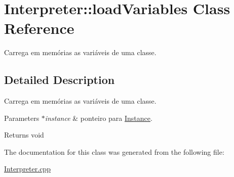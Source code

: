 \hypertarget{class_interpreter_1_1load_variables}{}\section{Interpreter\+:\+:load\+Variables Class Reference}
\label{class_interpreter_1_1load_variables}


Carrega em memórias as variáveis de uma classe.  




\subsection{Detailed Description}
Carrega em memórias as variáveis de uma classe. 


\begin{DoxyParams}{Parameters}
{\em $\ast$instance} & ponteiro para \hyperlink{struct_instance}{Instance}. \\
\hline
\end{DoxyParams}
\begin{DoxyReturn}{Returns}
void 
\end{DoxyReturn}


The documentation for this class was generated from the following file\+:\begin{DoxyCompactItemize}
\item 
\hyperlink{_interpreter_8cpp}{Interpreter.\+cpp}\end{DoxyCompactItemize}
